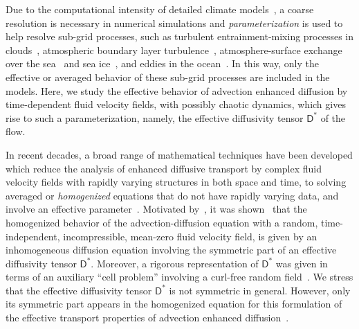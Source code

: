 \documentclass[leqno,onefignum,onetabnum]{siamltex1213}
\newcommand{\Dm}{\mathsf{D}}
\begin{document}
Due to the computational intensity of detailed climate
models~\cite{Griffies:2003:10.1007,Washington:1986:9780935702521,Neelin:2010:CCCM},
a coarse resolution is necessary in numerical simulations and
\emph{parameterization} is used to help resolve sub-grid
processes, such as turbulent 
entrainment-mixing processes in clouds~\cite{Lu:JGR:D50094},
atmospheric boundary layer turbulence~\cite{Bretherton:JOC:5655449},
atmosphere-surface exchange over the
sea~\cite{Fairall:1996:JGRC6562} and sea
ice~\cite{Sorensen:TC:2014,Andreas:2010:QJ618,Andreas:JH:2010,Vihma:2014:9923},
and eddies in the ocean~\cite{McDougall:2001:book,Gent:JPO:1995}. In
this way, only the effective or averaged behavior of these sub-grid
processes are included in the models. Here, we study the effective
behavior of advection enhanced diffusion by time-dependent fluid
velocity fields, with possibly chaotic dynamics, which gives rise to
such a parameterization, namely, the effective diffusivity tensor
$\Dm^*$ of the flow. 



In recent decades, a broad range of mathematical techniques have been
developed
%
%
which reduce the analysis of enhanced diffusive transport by complex
fluid velocity fields with rapidly varying structures in both space
and time, to 
solving averaged or \emph{homogenized} equations that do not have
rapidly varying data, and involve an effective
parameter~\cite{Papanicolaou:1981:36:8,McLaughlin:SIAM_JAM:780,Bensoussan:Book:1978,Biferale:PF:2725,Fannjiang:1994:SIAM_JAM:333,Fannjiang:1997:1033,Mauri:1991:3:743,Pavliotis:PHD_Thesis,Pavliotis:CMS:2007:507,Clark:1998:364,Holmes:1995:94481954,Hornung:1997:9780387947860,Majda:Kramer:1999:book,Majda:1994:10.1088}. Motivated
by~\cite{Papanicolaou:RF-835}, it was
shown~\cite{McLaughlin:SIAM_JAM:780} that the homogenized behavior of
the advection-diffusion equation with a random, time-independent,
incompressible, mean-zero fluid velocity field, is given by an
inhomogeneous diffusion equation involving the symmetric part of an
effective diffusivity tensor $\Dm^*$. Moreover, a rigorous
representation of $\Dm^*$ was given in terms of an auxiliary ``cell
problem'' involving a curl-free random
field~\cite{McLaughlin:SIAM_JAM:780}. We stress that the effective
diffusivity tensor $\Dm^*$ is not symmetric in general. However, only
its symmetric part appears in the homogenized equation for this
formulation of the effective transport properties of advection
enhanced diffusion~\cite{McLaughlin:SIAM_JAM:780}.    
\end{document}

